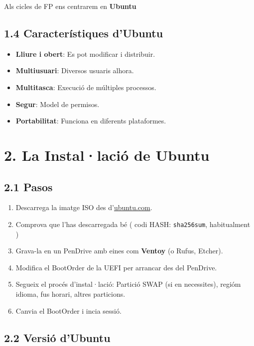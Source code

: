 \documentclass[
  a4paper,
]{article}
\providecommand{\tightlist}{%
  \setlength{\itemsep}{0pt}\setlength{\parskip}{0pt}}
\begin{document}
Als cicles de FP ens centrarem en \textbf{Ubuntu}

\subsection{1.4 Característiques
d'Ubuntu}\label{caracteruxedstiques-dubuntu}

\begin{itemize}
\tightlist
\item
  \textbf{Lliure i obert}: Es pot modificar i distribuir.
\item
  \textbf{Multiusuari}: Diversos usuaris alhora.
\item
  \textbf{Multitasca}: Execució de múltiples processos.
\item
  \textbf{Segur}: Model de permisos.
\item
  \textbf{Portabilitat}: Funciona en diferents plataformes.
\end{itemize}

\section{2. La Instal·lació de
Ubuntu}\label{la-installaciuxf3-de-ubuntu}

\subsection{2.1 Pasos}\label{pasos}

\begin{enumerate}
\def\labelenumi{\arabic{enumi}.}
\tightlist
\item
  Descarrega la imatge ISO des d'\href{https://ubuntu.com/}{ubuntu.com}.
\item
  Comprova que l'has descarregada bé ( codi HASH: \texttt{sha256sum},
  habitualment )
\item
  Grava-la en un PenDrive amb eines com \textbf{Ventoy} (o Rufus,
  Etcher).
\item
  Modifica el BootOrder de la UEFI per arrancar des del PenDrive.
\item
  Segueix el procés d'instal·lació: Partició SWAP (si en necessites),
  regióm idioma, fus horari, altres particions.
\item
  Canvia el BootOrder i incia sessió.
\end{enumerate}

\subsection{2.2 Versió d'Ubuntu}\label{versiuxf3-dubuntu}
\end{document}
